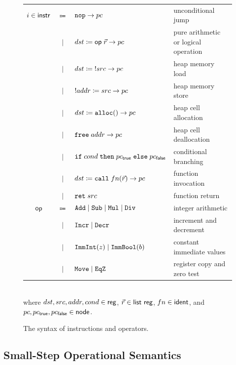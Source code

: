 \documentclass[report.tex]{subfiles}
\begin{document}
\begin{figure}[htp]
  \centering
  \begin{tabular}{ccll}
    $i \in \textsf{instr}$
    & $\Coloneqq$
    & $\mathtt{nop} \to pc$
    & unconditional jump \\
    & $\mid$
    & $dst \coloneqq \textsf{op}\; \vec{r} \to pc$
    & pure arithmetic or logical operation \\
    & $\mid$
    & $dst \coloneqq {!src} \to pc$
    & heap memory load \\
    & $\mid$
    & ${!addr} \coloneqq src \to pc$
    & heap memory store \\
    & $\mid$
    & $dst \coloneqq \mathtt{alloc}() \to pc$
    & heap cell allocation \\
    & $\mid$
    & $\mathtt{free}\; addr \to pc$
    & heap cell deallocation \\
    & $\mid$
    & $\mathtt{if}\; cond\; \mathtt{then}\; pc_{\textsf{true}}\; \mathtt{else}\; pc_{\textsf{false}}$
    & conditional branching \\
    & $\mid$
    & $dst \coloneqq \mathtt{call}\; fn(\vec{r}) \to pc$
    & function invocation \\
    & $\mid$
    & $\mathtt{ret}\; src$
    & function return
    \\[1em]
    $\textsf{op}$
    & $\Coloneqq$
    & $\mathtt{Add} \mid \mathtt{Sub} \mid \mathtt{Mul} \mid \mathtt{Div}$
    & integer arithmetic \\
    & $\mid$
    & $\mathtt{Incr} \mid \mathtt{Decr}$
    & increment and decrement \\
    & $\mid$
    & $\mathtt{ImmInt}(z) \mid \mathtt{ImmBool}(b)$
    & constant immediate values \\
    & $\mid$
    & $\mathtt{Move} \mid \mathtt{EqZ}$
    & register copy and zero test
  \end{tabular}
  \\[0.8em]
  {\small
    where $dst, src, addr, cond \in \textsf{reg}$,
    $\vec{r} \in \textsf{list}~{\textsf{reg}}$,
    $fn \in \textsf{ident}$,
    and $pc, pc_{\textsf{true}}, pc_{\textsf{false}} \in \textsf{node}$.
  }
  \caption{The syntax of \muRTL{} instructions and operators.}
  \label{fig:rtl-grammar}
\end{figure}

\subsection{Small-Step Operational Semantics}
\end{document}
